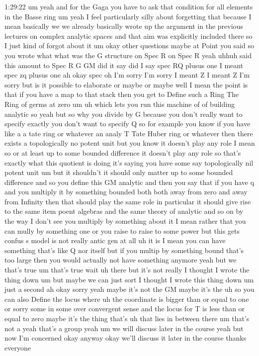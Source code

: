 \begin{unfinished}{1:29:22}
um yeah and for the Gaga you have to ask
that condition for all elements in the
Basse ring
um
yeah I feel particularly silly about
forgetting that because I mean basically
we we already basically wrote up the
argument in the previous lectures on
complex analytic spaces and that aim was
explicitly included there so I just kind
of forgot about it
um okay other
questions
maybe at Point you said so you wrote
what what was the G structure on Spec R
on Spec R yeah uhhuh said this amount
to Spec
R G GM did it say did I say spec RQ
plusus one I meant spec zq plusus one ah
okay spec oh I'm sorry I'm sorry I meant
Z I meant Z I'm sorry but is it possible
to
elaborate or maybe or
maybe
well I mean the point is that if you
have a map to that stack then you get to
Define such a Ring The Ring of germs at
zero
um uh which lets you run this machine of
of building
analytic so yeah but so why you divide
by G because you don't really want to
specify exactly you don't want to
specify Q so for example you know if you
have like a a tate ring or whatever an
analy T Tate Huber ring or whatever then
there exists a topologically no potent
unit but you know it doesn't play any
role I mean so or at least up to some
bounded difference it doesn't play any
role so that's exactly what this
quotient is doing it's saying you have
some say topologically nil potent unit
um but it shouldn't it should only
matter up to some bounded difference and
so you define this GM analytic and then
you say that if you have q and you
multiply it by something bounded both
both away from zero and away from
Infinity then that should play the same
role in particular it should give rise
to the same item poent algebras and the
same theory of
analytic and so
on by the way I don't see you multiply
by something about it I mean rather that
you can mully by something one or you
raise to raise to some
power but this gets
confus s model is not really antic gen
at
all uh it
is I mean you can have something that's
like Q nor itself but if you multip by
something bound that's too large then
you would actually not have something
anymore yeah but
we that's
true
um that's true wait
uh there but it's not
really I thought I wrote the thing
down
um but maybe we can just
sort I thought I wrote this thing
down um just a
second
ah okay sorry yeah maybe it's not the GM
maybe it's the uh so you can also Define
the locus
where uh the coordinate is bigger than
or equal to one or sorry some in some
over convergent sense and the locus for
T is less than or equal to zero maybe
it's the thing that's uh that lies in
between
there um that's not a yeah that's a
group yeah
um we will discuss later in the
course
yeah but now I'm concerned okay anyway
okay we'll discuss it later in the
course thanks everyone
\end{unfinished}